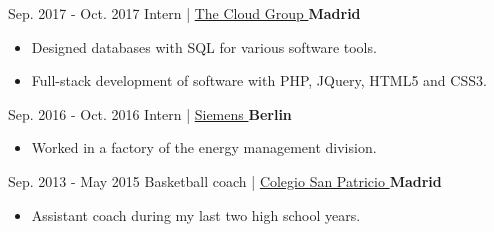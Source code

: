 \documentclass[]{commands}
\begin{document}
\begin{entrylist}
  \entry
    {Sep. 2017 - Oct. 2017}
    {Intern | }
    { \href{https://thecloud.group/}{\small The Cloud Group \faMousePointer}}
    {\normalsize\textbf{\color{ipsgreen}\faMapMarker\space Madrid}}
    {\jobspace
    \begin{itemize}[leftmargin=*, itemsep = 0.1em]
        \item Designed databases with SQL for various software tools. 
        \item Full-stack development of software with PHP, JQuery, HTML5 and CSS3. \\
    \end{itemize}}
    
  \entry
    {Sep. 2016 - Oct. 2016}
    {Intern | }
    { \href{https://www.siemens.com/global/en.html}{\small Siemens \faMousePointer}}
    {\normalsize\textbf{\color{ipsgreen}\faMapMarker\space Berlin}}
    {\jobspace
    \begin{itemize}[leftmargin=*, itemsep = 0.1em]
        \item Worked in a factory of the energy management division. \\
    \end{itemize}}
    
  \entry
    {Sep. 2013 - May 2015}
    {Basketball coach | }
    { \href{https://colegiosanpatriciomadrid.com/en/our-campuses/school-el-soto/extra-curricular-activities/}{\small Colegio San Patricio \faMousePointer}}
    {\normalsize\textbf{\color{ipsgreen}\faMapMarker\space Madrid}}
    {\jobspace
    \begin{itemize}[leftmargin=*, itemsep = 0.1em]
        \item Assistant coach during my last two high school years. \\
    \end{itemize}}
    
\end{entrylist}

\end{document}
